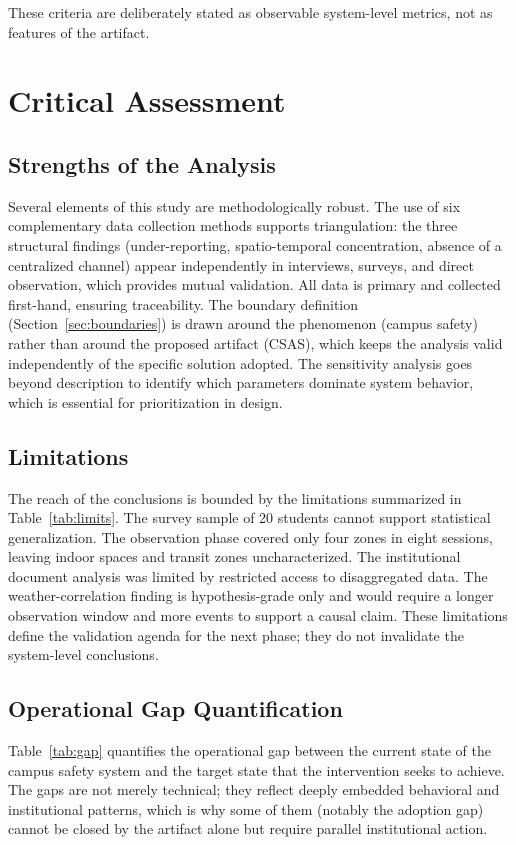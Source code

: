 \documentclass[conference]{IEEEtran}
\begin{document}
These criteria are deliberately stated as observable system-level
metrics, not as features of the artifact.

\section{Critical Assessment}
\label{sec:critical}

\subsection{Strengths of the Analysis}
Several elements of this study are methodologically robust. The use
of six complementary data collection methods supports triangulation:
the three structural findings (under-reporting, spatio-temporal
concentration, absence of a centralized channel) appear independently
in interviews, surveys, and direct observation, which provides mutual
validation. All data is primary and collected first-hand, ensuring
traceability. The boundary definition (Section~\ref{sec:boundaries})
is drawn around the phenomenon (campus safety) rather than around the
proposed artifact (CSAS), which keeps the analysis valid independently
of the specific solution adopted. The sensitivity analysis goes beyond
description to identify which parameters dominate system behavior,
which is essential for prioritization in design.

\subsection{Limitations}
The reach of the conclusions is bounded by the limitations summarized
in Table~\ref{tab:limits}. The survey sample of 20 students cannot
support statistical generalization. The observation phase covered
only four zones in eight sessions, leaving indoor spaces and transit
zones uncharacterized. The institutional document analysis was
limited by restricted access to disaggregated data. The
weather-correlation finding is hypothesis-grade only and would require
a longer observation window and more events to support a causal
claim. These limitations define the validation agenda for the next
phase; they do not invalidate the system-level conclusions.

\subsection{Operational Gap Quantification}
\label{sec:gap}
Table~\ref{tab:gap} quantifies the operational gap between the
current state of the campus safety system and the target state that
the intervention seeks to achieve. The gaps are not merely technical;
they reflect deeply embedded behavioral and institutional patterns,
which is why some of them (notably the adoption gap) cannot be closed
by the artifact alone but require parallel institutional action.
\end{document}
